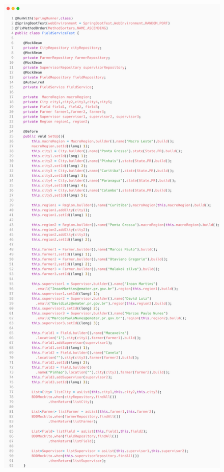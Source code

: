 \begin{itemize}
\begin{figure}[H]
	\centering
	\includegraphics[scale=0.13]{dados/figuras/carbonFieldServicebuild.png}
\end{figure}


\end{itemize}

